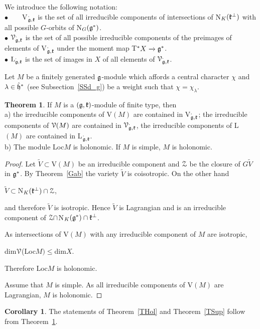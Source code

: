 \documentclass[12pt]{amsart}
\theoremstyle{definition}\newtheorem{theorem}{Theorem}[section]
\newtheorem{corollary}[proposition]{Corollary}
\theoremstyle{definition}\newtheorem{definition}[proposition]{Definition}
\theoremstyle{remark}\newtheorem{example}[proposition]{Example}
\renewcommand{\to}[1][]{\xrightarrow{#1}}
\begin{document}
We introduce the following notation:\\$\bullet$~~~~V$^._{\frak g, \frak k}$ is the set of all irreducible components of  intersections of N$_K(\frak k^\bot)$ with all possible $G$-orbits of N$_G(\frak g^*)$.\\$\bullet$ $\EuScript V^._{\frak g, \frak k}$ is the set of all possible irreducible components of the preimages of elements of V$^._{\frak g, \frak k}$ under the moment map T$^*X\to\frak g^*$.\\$\bullet$ $\mathrm L^._{\frak g, \frak k}$ is the set of images in $X$ of all elements of $\EuScript V^._{\frak g, \frak k}$.

Let $M$ be a finitely generated $\frak g$-module which affords a central character $\chi$ and $\lambda\in\hat{\frak h}^*$ (see Subsection~\ref{SSd_g}) be a weight such that $\chi=\chi_\lambda$.
\begin{theorem}\label{Tisohol} If $M$ is a $(\frak g, \frak k)$-module of finite type, then\\a) the irreducible components of V$(M)$ are contained in V$^._{\frak g, \frak k}$;  the irreducible components of $\EuScript V(M)$ are contained in $\EuScript V^._{\frak g, \frak k}$, the irreducible components of L$(M)$ are contained in L$^._{\frak g, \frak k}$.\\b) The module Loc$M$ is holonomic. If $M$ is simple, $M$ is holonomic.\end{theorem}
\begin{proof}Let $\tilde V\subset$V$(M)$ be an irreducible component and $\EuScript Z$ be the closure of $G\tilde V$ in $\frak g^*$. By Theorem~\ref{Gab} the variety $\tilde V$ is coisotropic. On the other hand \begin{center}$\tilde V\subset$N$_K(\frak k^\bot)\cap \EuScript Z$,\end{center} and therefore $\tilde V$ is isotropic. Hence $\tilde V$ is Lagrangian and is an irreducible component of $\EuScript Z\cap$N$_K(\frak g^*)\cap\frak k^\bot$.

As intersections of V$(M)$ with any irreducible component of $M$ are isotropic, \begin{center}dim$\EuScript V$(Loc$M)\le$dim$X$.\end{center} Therefore Loc$M$ is holonomic.

Assume that $M$ is simple. As all irreducible components of V$(M)$ are Lagrangian, $M$ is holonomic.\end{proof}
\begin{corollary}\label{Cholsup} The statements of Theorem~\ref{THol} and Theorem~\ref{TSup} follow from Theorem~\ref{Tisohol}.\end{corollary}
\end{document}
